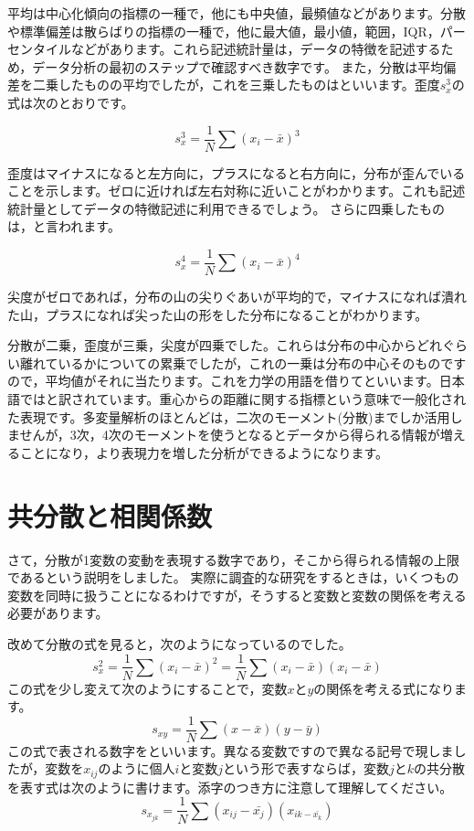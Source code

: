 \documentclass{ltjsbook}
\begin{document}
平均は中心化傾向の指標の一種で，他にも中央値，最頻値などがあります。分散や標準偏差は散らばりの指標の一種で，他に最大値，最小値，範囲，IQR，パーセンタイルなどがあります。これら記述統計量は，データの特徴を記述するため，データ分析の最初のステップで確認すべき数字です。
また，分散は平均偏差を二乗したものの平均でしたが，これを三乗したものはといいます。歪度$s_x^3$の式は次のとおりです。

\[ s_x^3 = \frac{1}{N}\sum (x_i - \bar{x})^3 \]

歪度はマイナスになると左方向に，プラスになると右方向に，分布が歪んでいることを示します。ゼロに近ければ左右対称に近いことがわかります。これも記述統計量としてデータの特徴記述に利用できるでしょう。
さらに四乗したものは，と言われます。

\[ s_x^4 = \frac{1}{N}\sum (x_i - \bar{x})^4 \]

尖度がゼロであれば，分布の山の尖りぐあいが平均的で，マイナスになれば潰れた山，プラスになれば尖った山の形をした分布になることがわかります。

分散が二乗，歪度が三乗，尖度が四乗でした。これらは分布の中心からどれぐらい離れているかについての累乗でしたが，これの一乗は分布の中心そのものですので，平均値がそれに当たります。これを力学の用語を借りてといいます。日本語ではと訳されています。重心からの距離に関する指標という意味で一般化された表現です。多変量解析のほとんどは，二次のモーメント(分散)までしか活用しませんが，3次，4次のモーメントを使うとなるとデータから得られる情報が増えることになり，より表現力を増した分析ができるようになります。

\section{共分散と相関係数}
さて，分散が1変数の変動を表現する数字であり，そこから得られる情報の上限であるという説明をしました。
実際に調査的な研究をするときは，いくつもの変数を同時に扱うことになるわけですが，そうすると変数と変数の関係を考える必要があります。

改めて分散の式を見ると，次のようになっているのでした。
\[  s_x^2 = \frac{1}{N}\sum (x_i - \bar{x})^2 = \frac{1}{N}\sum (x_i - \bar{x})(x_i - \bar{x}) \]
この式を少し変えて次のようにすることで，変数$x$と$y$の関係を考える式になります。
\[ s_{xy} = \frac{1}{N} \sum(x-\bar{x})(y-\bar{y})\]
この式で表される数字をといいます。異なる変数ですので異なる記号で現しましたが，変数を$x_{ij}$のように個人$i$と変数$j$という形で表すならば，変数$j$と$k$の共分散を表す式は次のように書けます。添字のつき方に注意して理解してください。
\[ s_{x_{jk}} = \frac{1}{N} \sum (x_{ij} - \bar{x_j})(x_{ik - \bar{x_k}}) \]
\end{document}
